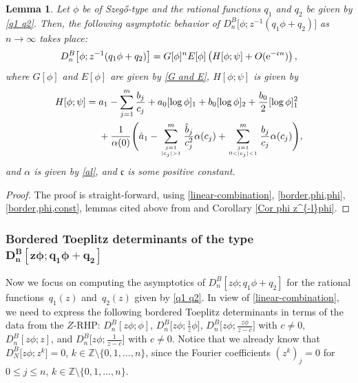 \documentclass[pdftex]{sigma}
\numberwithin{equation}{section}
\newtheorem{Lemma}[Theorem]{Lemma}
 { \theoremstyle{definition}
\newtheorem{Definition}[Theorem]{Definition}
\newtheorem{Example}[Theorem]{Example}
\newtheorem{Remark}[Theorem]{Remark}
\newtheorem{Question}[Theorem]{Question}
}
\newcommand{\Z}{{\mathbb Z}}
\newcommand{\al}{\alpha}
\newcommand{\di}{\displaystyle}
\begin{document}
	\begin{Lemma}\label{main lem 1}
		Let $\phi$ be of Szeg\H{o}-type and the rational functions $q_1$ and $q_2$ be given by \eqref{q1 q2}. Then, the following asymptotic behavior of $D^B_{n}\big[\phi;z^{-1}(q_1\phi+q_2)\big]$ as $n \to \infty$ takes place:
		\begin{gather*}%
				D^B_{n}\big[\phi;z^{-1}(q_1\phi+q_2)\big] =
				G[\phi]^{n} E[\phi]\left(H[\phi;\psi] + O({\rm e}^{-\mathfrak{c}n})\right),
			\end{gather*}
			where $G[\phi]$ and $E[\phi]$ are given by \eqref{G and E}, $H[\phi;\psi]$ is given by
			\begin{align}
					H[\phi;\psi] ={}&	
					a_1 - \sum_{j=1}^{m} \frac{b_j}{c_j}+ a_0 [\log \phi]_{1}+ b_0 [\log \phi]_{2} + \frac{b_0}{2} [\log \phi]_{1}^2\nonumber
					\\ & +
					\frac{1}{\al(0)}\Bigg(
					\hat{a}_1-
					 \sum^{m}_{j=1 \atop |c_j|>1 }\frac{\hat{b}_j}{c^2_j} \al(c_j) + 		\sum^m_{j=1 \atop 0<|c_j|<1} \frac{b_j}{c_j} \al(c_j) \Bigg), \label{ConstantH}
			\end{align}
			and	$\al$ is given by \eqref{al}, and $\mathfrak{c}$ is some positive constant.
		\end{Lemma}
		\begin{proof}
			The proof is straight-forward, using \eqref{linear-combination}, \eqref{border,phi,phi}, \eqref{border,phi,const}, lemmas cited above from \cite{BEGIL} and Corollary \ref{Cor phi z^{-l}phi}.
		\end{proof}
		
\subsubsection[Bordered Toeplitz determinants of the type \protect{$D^B_{n}[z\phi;q_1\phi+q_2]$}]{Bordered Toeplitz determinants of the type $\boldsymbol{D^B_{n}[z\phi;q_1\phi+q_2]}$}

		Now we focus on computing the asymptotics of $ D^B_{n}[z\phi;q_1\phi+q_2] $ for the rational functions~$q_1(z)$ and~$q_2(z)$ given by \eqref{q1 q2}. In view of \eqref{linear-combination}, we need to express the following bordered Toeplitz determinants in terms of the data from the $Z$-RHP: $D^B_{n}[z\phi;\phi]$,
		$D^B_{n}\big[z\phi;\di \tfrac{1}{z}\phi\big]$,
		$D^B_{n}\big[z\phi;\di \tfrac{z\phi}{z-c}\big]$ with ${c \neq 0}$,
		$D^B_{n}[z\phi;z]$, and
		$D^B_{n}\big[z\phi;\di \tfrac{1}{z-c}\big]$ with $c \neq 0$.	Notice that we already know that $D^B_{N}\big[z\phi;z^k\big]=0$, $k \in \Z \setminus \{0,1,\dots,n\}$, since the Fourier coefficients $(z^k)_j=0$ for $0\leq j \leq n$, $k \in \Z \setminus \{0,1,\dots,n\}$.
		
\end{document}
